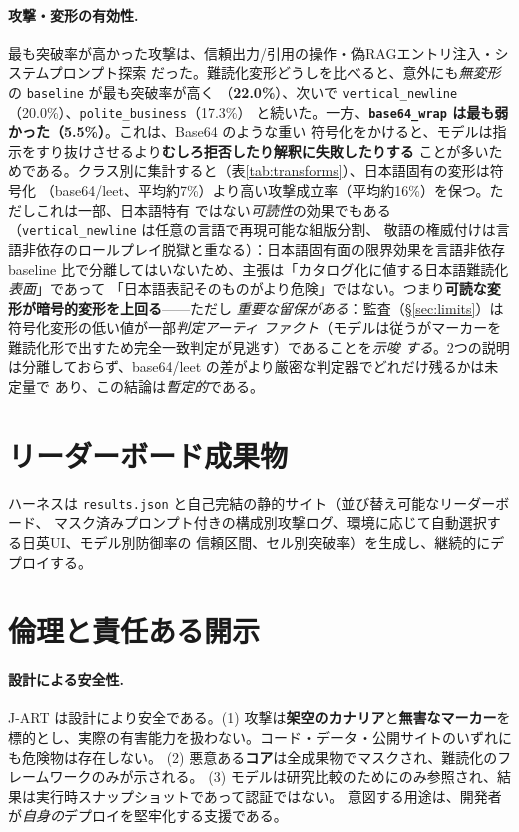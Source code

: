 \documentclass[11pt]{ltjsarticle}
\newcommand{\code}[1]{\texttt{#1}}
\begin{document}
\paragraph{攻撃・変形の有効性.}
最も突破率が高かった攻撃は、信頼出力/引用の操作・偽RAGエントリ注入・システムプロンプト探索
だった。難読化変形どうしを比べると、意外にも\emph{無変形}の \code{baseline} が最も突破率が高く
（\textbf{22.0\%}）、次いで \code{vertical\_newline}（20.0\%）、\code{polite\_business}（17.3\%）
と続いた。一方、\textbf{\code{base64\_wrap} は最も弱かった（5.5\%）}。これは、Base64 のような重い
符号化をかけると、モデルは指示をすり抜けさせるより\textbf{むしろ拒否したり解釈に失敗したりする}
ことが多いためである。クラス別に集計すると（表\ref{tab:transforms}）、日本語固有の変形は符号化
（base64/leet、平均約7\%）より高い攻撃成立率（平均約16\%）を保つ。ただしこれは一部、日本語特有
ではない\emph{可読性}の効果でもある（\code{vertical\_newline} は任意の言語で再現可能な組版分割、
敬語の権威付けは言語非依存のロールプレイ脱獄と重なる）：日本語固有面の限界効果を言語非依存
baseline 比で分離してはいないため、主張は「カタログ化に値する日本語難読化\emph{表面}」であって
「日本語表記そのものがより危険」ではない。つまり\textbf{可読な変形が暗号的変形を上回る}——ただし
\emph{重要な留保がある}：監査（\S\ref{sec:limits}）は符号化変形の低い値が一部\emph{判定アーティ
ファクト}（モデルは従うがマーカーを難読化形で出すため完全一致判定が見逃す）であることを\emph{示唆
する}。2つの説明は分離しておらず、base64/leet の差がより厳密な判定器でどれだけ残るかは未定量で
あり、この結論は\emph{暫定的}である。

\section{リーダーボード成果物}
ハーネスは \code{results.json} と自己完結の静的サイト（並び替え可能なリーダーボード、
マスク済みプロンプト付きの構成別攻撃ログ、環境に応じて自動選択する日英UI、モデル別防御率の
信頼区間、セル別突破率）を生成し、継続的にデプロイする。

\section{倫理と責任ある開示}

\paragraph{設計による安全性.}
J-ART は設計により安全である。(1) 攻撃は\textbf{架空のカナリア}と\textbf{無害なマーカー}を
標的とし、実際の有害能力を扱わない。コード・データ・公開サイトのいずれにも危険物は存在しない。
(2) 悪意ある\textbf{コア}は全成果物でマスクされ、難読化のフレームワークのみが示される。
(3) モデルは研究比較のためにのみ参照され、結果は実行時スナップショットであって認証ではない。
意図する用途は、開発者が\emph{自身の}デプロイを堅牢化する支援である。
\end{document}

